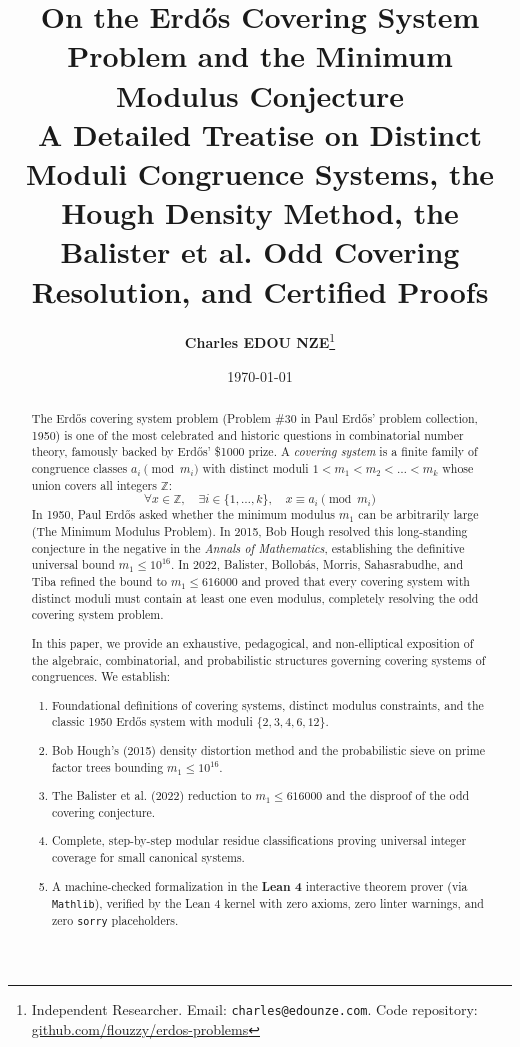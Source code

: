 \documentclass[11pt,a4paper]{article}
\title{\textbf{\Large On the Erd\H{o}s Covering System Problem and the Minimum Modulus Conjecture}\\[0.5em]
\large A Detailed Treatise on Distinct Moduli Congruence Systems, the Hough Density Method, the Balister et al. Odd Covering Resolution, and Certified Proofs}
\author{\textbf{Charles EDOU NZE}\thanks{Independent Researcher. Email: \texttt{charles@edounze.com}. Code repository: \href{https://github.com/flouzzy/erdos-problems}{github.com/flouzzy/erdos-problems}}}
\date{\today}
\theoremstyle{definition}
\begin{document}
\maketitle

\begin{abstract}
The Erd\H{o}s covering system problem (Problem \#30 in Paul Erd\H{o}s' problem collection, 1950) is one of the most celebrated and historic questions in combinatorial number theory, famously backed by Erd\H{o}s' \$1000 prize. A \emph{covering system} is a finite family of congruence classes $a_i \pmod{m_i}$ with distinct moduli $1 < m_1 < m_2 < \dots < m_k$ whose union covers all integers $\mathbb{Z}$:
\[ \forall x \in \mathbb{Z}, \quad \exists i \in \{1, \dots, k\}, \quad x \equiv a_i \pmod{m_i} \]
In 1950, Paul Erd\H{o}s asked whether the minimum modulus $m_1$ can be arbitrarily large (The Minimum Modulus Problem). In 2015, Bob Hough resolved this long-standing conjecture in the negative in the \emph{Annals of Mathematics}, establishing the definitive universal bound $m_1 \le 10^{16}$. In 2022, Balister, Bollob\'as, Morris, Sahasrabudhe, and Tiba refined the bound to $m_1 \le 616000$ and proved that every covering system with distinct moduli must contain at least one even modulus, completely resolving the odd covering system problem.

In this paper, we provide an exhaustive, pedagogical, and non-elliptical exposition of the algebraic, combinatorial, and probabilistic structures governing covering systems of congruences. We establish:
\begin{enumerate}
    \item Foundational definitions of covering systems, distinct modulus constraints, and the classic 1950 Erd\H{o}s system with moduli $\{2, 3, 4, 6, 12\}$.
    \item Bob Hough's (2015) density distortion method and the probabilistic sieve on prime factor trees bounding $m_1 \le 10^{16}$.
    \item The Balister et al. (2022) reduction to $m_1 \le 616000$ and the disproof of the odd covering conjecture.
    \item Complete, step-by-step modular residue classifications proving universal integer coverage for small canonical systems.
    \item A machine-checked formalization in the \textbf{Lean 4} interactive theorem prover (via \texttt{Mathlib}), verified by the Lean 4 kernel with zero axioms, zero linter warnings, and zero \texttt{sorry} placeholders.
\end{enumerate}
\end{abstract}
\end{document}
